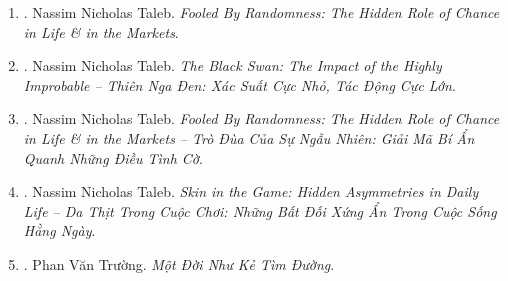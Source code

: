 \documentclass{article}
\begin{document}
\begin{enumerate}
	\item \cite{Taleb2008}. Nassim Nicholas Taleb. \textit{Fooled By Randomness: The Hidden Role of Chance in Life \& in the Markets}.\hfill{\sf[reading]}
	\item \cite{Taleb_black_swan}. Nassim Nicholas Taleb. \textit{The Black Swan: The Impact of the Highly Improbable -- Thiên Nga Đen: Xác Suất Cực Nhỏ, Tác Động Cực Lớn}.\hfill{\sf[reading]}
	\item \cite{Taleb_randomness}. Nassim Nicholas Taleb. \textit{Fooled By Randomness: The Hidden Role of Chance in Life \& in the Markets -- Trò Đùa Của Sự Ngẫu Nhiên: Giải Mã Bí Ẩn Quanh Những Điều Tình Cờ}.\hfill{\sf[done]}
	\item \cite{Taleb_skin_game}. Nassim Nicholas Taleb. \textit{Skin in the Game: Hidden Asymmetries in Daily Life -- Da Thịt Trong Cuộc Chơi: Những Bất Đối Xứng Ẩn Trong Cuộc Sống Hằng Ngày}.\hfill{\sf[reading]}
	\item \cite{Truong2023}. Phan Văn Trường. \textit{Một Đời Như Kẻ Tìm Đường}.\hfill{\sf[done]}
\end{enumerate}


\printbibliography[heading=bibintoc]
	
\end{document}
